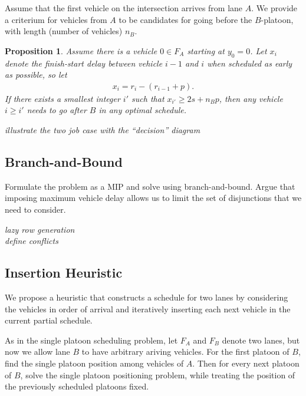 \documentclass{article}
\theoremstyle{definition}
\theoremstyle{plain}
\newtheorem{proposition}{Proposition}[section]
\begin{document}
Assume that the first vehicle on the intersection arrives from lane $A$.
We provide a criterium for vehicles from $A$ to be candidates for going before the $B$-platoon, with length (number of vehicles) $n_{B}$.

\begin{proposition}
  Assume there is a vehicle $0 \in F_{A}$ starting at $y_{0} = 0$. Let $x_{i}$
  denote the finish-start delay between vehicle $i-1$ and $i$ when scheduled as
  early as possible, so let
  \begin{align*}
    x_{i} = r_{i} - (r_{i-1} + p) .
  \end{align*}
  If there exists a smallest integer $i'$ such that $x_{i'} \geq 2s + n_{B}p$,
  then any vehicle $i \geq i'$ needs to go after $B$ in any optimal schedule.
\end{proposition}

\noindent
\textit{\textit{\color{blue}illustrate the two job case with the ``decision'' diagram}}

\subsection{Branch-and-Bound}

Formulate the problem as a MIP and solve using branch-and-bound. Argue that
imposing maximum vehicle delay allows us to limit the set of disjunctions that
we need to consider.

\vspace{0.5em}
\noindent
\textit{\color{blue}lazy row generation}\\
\textit{\color{blue}define conflicts}


\subsection{Insertion Heuristic}

We propose a heuristic that constructs a schedule for two lanes by considering
the vehicles in order of arrival and iteratively inserting each next vehicle in
the current partial schedule.

As in the single platoon scheduling problem, let $F_{A}$ and $F_{B}$ denote two
lanes, but now we allow lane $B$ to have arbitrary ariving vehicles. For the
first platoon of $B$, find the single platoon position among vehicles of $A$.
Then for every next platoon of $B$, solve the single platoon positioning
problem, while treating the position of the previously scheduled platoons fixed.
\end{document}
